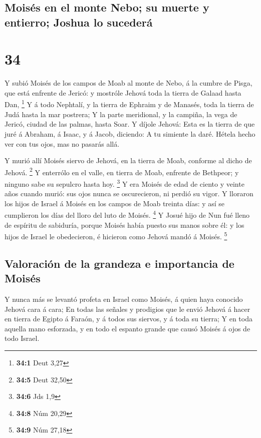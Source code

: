 \hypertarget{moisuxe9s-en-el-monte-nebo-su-muerte-y-entierro-joshua-lo-sucederuxe1}{%
\subsection{Moisés en el monte Nebo; su muerte y entierro; Joshua lo
sucederá}\label{moisuxe9s-en-el-monte-nebo-su-muerte-y-entierro-joshua-lo-sucederuxe1}}

\hypertarget{section-33}{%
\section{34}\label{section-33}}

 Y subió Moisés de los campos de Moab al monte de Nebo, á
la cumbre de Pisga, que está enfrente de Jericó: y mostróle Jehová toda
la tierra de Galaad hasta Dan, \footnote{\textbf{34:1} Deut 3,27}
 Y á todo Nephtalí, y la tierra de Ephraim y de Manasés,
toda la tierra de Judá hasta la mar postrera;  Y la parte
meridional, y la campiña, la vega de Jericó, ciudad de las palmas, hasta
Soar.  Y díjole Jehová: Esta es la tierra de que juré á
Abraham, á Isaac, y á Jacob, diciendo: A tu simiente la daré. Hétela
hecho ver con tus ojos, mas no pasarás allá.

 Y murió allí Moisés siervo de Jehová, en la tierra de
Moab, conforme al dicho de Jehová. \footnote{\textbf{34:5} Deut 32,50}
 Y enterrólo en el valle, en tierra de Moab, enfrente de
Bethpeor; y ninguno sabe su sepulcro hasta hoy. \footnote{\textbf{34:6}
  Jds 1,9}  Y era Moisés de edad de ciento y veinte años
cuando murió: sus ojos nunca se oscurecieron, ni perdió su vigor.
 Y lloraron los hijos de Israel á Moisés en los campos de
Moab treinta días: y así se cumplieron los días del lloro del luto de
Moisés. \footnote{\textbf{34:8} Núm 20,29}  Y Josué hijo
de Nun fué lleno de espíritu de sabiduría, porque Moisés había puesto
sus manos sobre él: y los hijos de Israel le obedecieron, é hicieron
como Jehová mandó á Moisés. \footnote{\textbf{34:9} Núm 27,18}

\hypertarget{valoraciuxf3n-de-la-grandeza-e-importancia-de-moisuxe9s}{%
\subsection{Valoración de la grandeza e importancia de
Moisés}\label{valoraciuxf3n-de-la-grandeza-e-importancia-de-moisuxe9s}}

 Y nunca más se levantó profeta en Israel como Moisés, á
quien haya conocido Jehová cara á cara;  En todas las
señales y prodigios que le envió Jehová á hacer en tierra de Egipto á
Faraón, y á todos sus siervos, y á toda su tierra;  Y en
toda aquella mano esforzada, y en todo el espanto grande que causó
Moisés á ojos de todo Israel.
